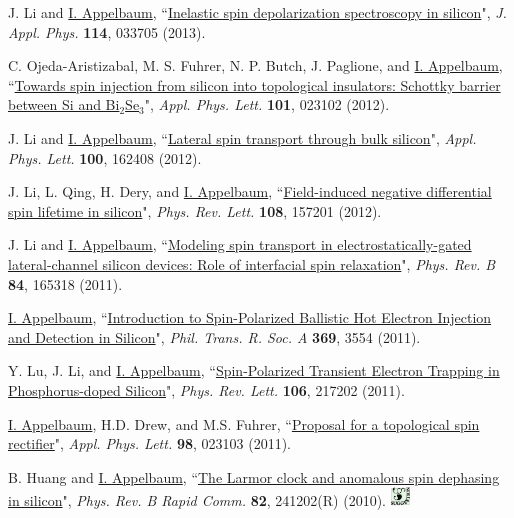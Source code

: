 \documentclass[paper=letter,fontsize=11pt]{scrartcl} %
\newcommand{\PaperEntry}[7]{
		\noindent #1, ``\href{#7}{#2}", \textit{#3} \textbf{#4}, #5 (#6).}
\begin{document}
\begin{etaremune}
\item\PaperEntry{J. Li and \underline{I. Appelbaum}}{Inelastic spin depolarization spectroscopy in silicon}{J. Appl. Phys.}{114}{033705}{2013}{http://dx.doi.org/10.1063/1.4815873}

\item\PaperEntry{C. Ojeda-Aristizabal, M. S. Fuhrer, N. P. Butch, J. Paglione, and \underline{I. Appelbaum}}{Towards spin injection from silicon into topological insulators: Schottky barrier between Si and Bi$_2$Se$_3$}{Appl. Phys. Lett.}{101}{023102}{2012}{http://dx.doi.org/10.1063/1.4733388}

\item\PaperEntry{J. Li and \underline{I. Appelbaum}}{Lateral spin transport through bulk silicon}{Appl. Phys. Lett.}{100}{162408}{2012}{http://dx.doi.org/10.1063/1.4704802}

\item\PaperEntry{J. Li, L. Qing, H. Dery, and \underline{I. Appelbaum}}{Field-induced negative differential spin lifetime in silicon}{Phys. Rev. Lett.}{108}{157201}{2012}{http://dx.doi.org/10.1103/PhysRevLett.108.157201}

\item\PaperEntry{J. Li and \underline{I. Appelbaum}}{Modeling spin transport in electrostatically-gated lateral-channel silicon devices: Role of interfacial spin relaxation}{Phys. Rev. B}{84}{165318}{2011}{http://dx.doi.org/10.1103/PhysRevB.84.165318}

\item\PaperEntry{\underline{I. Appelbaum}}{Introduction to Spin-Polarized Ballistic Hot Electron Injection and Detection in Silicon}{Phil. Trans. R. Soc. A}{369}{3554}{2011}{http://dx.doi.org/10.1098/rsta.2011.0137}

\item\PaperEntry{Y. Lu, J. Li, and \underline{I. Appelbaum}}{Spin-Polarized Transient Electron Trapping in Phosphorus-doped Silicon}{Phys. Rev. Lett.}{106}{217202}{2011}{http://dx.doi.org/10.1103/PhysRevLett.106.217202}

\item\PaperEntry{\underline{I. Appelbaum}, H.D. Drew, and M.S. Fuhrer}{Proposal for a topological spin rectifier}{Appl. Phys. Lett.}{98}{023103}{2011}{http://dx.doi.org/10.1063/1.3541545}

\item\PaperEntry{B. Huang and \underline{I. Appelbaum}}{The Larmor clock and anomalous spin dephasing in silicon}{Phys. Rev. B Rapid Comm.}{82}{241202(R)}{2010}{http://dx.doi.org/10.1103/PhysRevB.82.241202} \includegraphics[width=0.2in]{sug.pdf} 


\end{etaremune}
\end{document}
